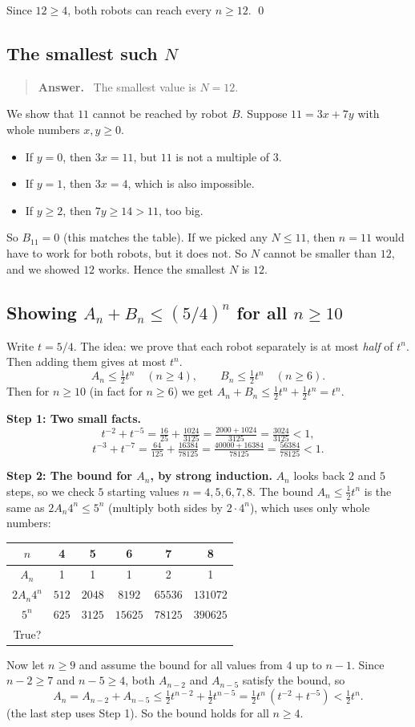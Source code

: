 \documentclass[11pt,a4paper]{article}
\newcommand{\cmark}{\checkmark}
\newenvironment{answerbox}[1][Answer]{\par\smallskip\begin{quote}\textbf{#1.}\ }{\end{quote}}
\theoremstyle{definition}
\begin{document}
Since $12\ge4$, both robots can reach every $n\ge12$. \qed

\subsection{The smallest such $N$}
\begin{answerbox}
The smallest value is $N=12$.
\end{answerbox}
We show that $11$ cannot be reached by robot $B$. Suppose $11=3x+7y$ with whole numbers $x,y\ge0$.
\begin{itemize}
  \item If $y=0$, then $3x=11$, but $11$ is not a multiple of $3$.
  \item If $y=1$, then $3x=4$, which is also impossible.
  \item If $y\ge2$, then $7y\ge14>11$, too big.
\end{itemize}
So $B_{11}=0$ (this matches the table). If we picked any $N\le11$, then $n=11$ would have to work for both robots, but it does not.
So $N$ cannot be smaller than $12$, and we showed $12$ works. Hence the smallest $N$ is $12$.

\subsection{Showing $A_n+B_n\le(5/4)^n$ for all $n\ge10$}
Write $t=5/4$. The idea: we prove that each robot separately is at most \emph{half} of $t^n$. Then adding them gives at most $t^n$.
\[
A_n\le\tfrac12t^n\quad(n\ge4),\qquad B_n\le\tfrac12t^n\quad(n\ge6).
\]
Then for $n\ge10$ (in fact for $n\ge6$) we get $A_n+B_n\le\tfrac12t^n+\tfrac12t^n=t^n$.

\textbf{Step 1: Two small facts.}
\[
t^{-2}+t^{-5}=\tfrac{16}{25}+\tfrac{1024}{3125}=\tfrac{2000+1024}{3125}=\tfrac{3024}{3125}<1,
\]
\[
t^{-3}+t^{-7}=\tfrac{64}{125}+\tfrac{16384}{78125}=\tfrac{40000+16384}{78125}=\tfrac{56384}{78125}<1.
\]

\textbf{Step 2: The bound for $A_n$, by strong induction.}
$A_n$ looks back $2$ and $5$ steps, so we check $5$ starting values $n=4,5,6,7,8$.
The bound $A_n\le\frac12t^n$ is the same as $2A_n4^n\le5^n$ (multiply both sides by $2\cdot4^n$), which uses only whole numbers:
\begin{center}\small
\begin{tabular}{@{}c|ccccc@{}}
$n$ & 4 & 5 & 6 & 7 & 8\\\hline
$A_n$ & 1 & 1 & 1 & 2 & 1\\
$2A_n4^n$ & $512$ & $2048$ & $8192$ & $65536$ & $131072$\\
$5^n$ & $625$ & $3125$ & $15625$ & $78125$ & $390625$\\
True? & \cmark&\cmark&\cmark&\cmark&\cmark
\end{tabular}
\end{center}
Now let $n\ge9$ and assume the bound for all values from $4$ up to $n-1$. Since $n-2\ge7$ and $n-5\ge4$, both $A_{n-2}$ and $A_{n-5}$ satisfy the bound, so
\[
A_n=A_{n-2}+A_{n-5}\le\tfrac12t^{n-2}+\tfrac12t^{n-5}=\tfrac12t^n\,(t^{-2}+t^{-5})<\tfrac12t^n .
\]
(the last step uses Step 1). So the bound holds for all $n\ge4$.
\end{document}
